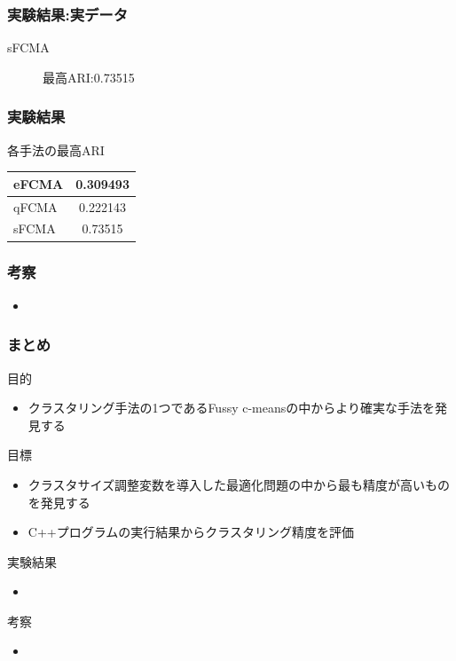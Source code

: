\documentclass[13pt,dvipdfmx]{beamer}
\begin{document}
\begin{frame}\frametitle{実験結果:実データ}
  \begin{block}{sFCMA}
   \begin{figure}[htbp]
    \begin{center}
   \end{center}
   \captionsetup{labelformat=empty,labelsep=none}
   \caption{最高ARI:0.73515}
  \end{figure}
 \end{block}
\end{frame}

\begin{frame}\frametitle{実験結果}
\begin{block}{各手法の最高ARI}
\vspace{5mm}
  \begin{table}[htb]
   \begin{tabular}{ l | c }\hline
     eFCMA & 0.309493 \\ \hline  
     qFCMA & 0.222143\\  \hline
     sFCMA & 0.73515\\ \hline
   \end{tabular}
  \end{table}
 \end{block}
\end{frame}

\begin{frame}\frametitle{考察}
\begin{itemize}
\item 
\end{itemize}
\end{frame}

\begin{frame}\frametitle{まとめ}
  \begin{block}{目的}
    \begin{itemize}
    \item クラスタリング手法の1つであるFussy c-meansの中からより確実な手法を発見する
    \end{itemize}
  \end{block}
  \begin{block}{目標}
    \begin{itemize}
     \item クラスタサイズ調整変数を導入した最適化問題の中から最も精度が高いものを発見する
     \item C++プログラムの実行結果からクラスタリング精度を評価
    \end{itemize}
  \end{block}
  \begin{block}{実験結果}
    \begin{itemize}
    \item 
    \end{itemize}
  \end{block}
  \begin{block}{考察}
      \begin{itemize}
    \item 
    \end{itemize}
  \end{block}
\end{frame}
\end{document}
